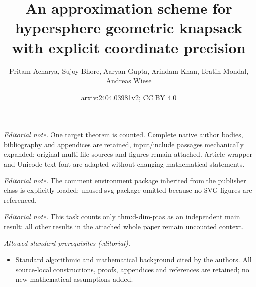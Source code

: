 \documentclass[10pt,a4paper]{article}
\title{An approximation scheme for hypersphere geometric knapsack with explicit coordinate precision}
\author{Pritam Acharya, Sujoy Bhore, Aaryan Gupta, Arindam Khan, Bratin Mondal, Andreas Wiese}
\date{arxiv:2404.03981v2; CC BY 4.0}
\theoremstyle{plain}
\theoremstyle{plain}
\theoremstyle{plain}
\theoremstyle{definition}
\begin{document}
\maketitle
\noindent\textit{Editorial note.} One target theorem is counted. Complete native author bodies, bibliography and appendices are retained, input/include passages mechanically expanded; original multi-file sources and figures remain attached. Article wrapper and Unicode text font are adapted without changing mathematical statements.\par\medskip
\noindent\textit{Editorial note.} The comment environment package inherited from the publisher class is explicitly loaded; unused svg package omitted because no SVG figures are referenced.\par\medskip
\noindent\textit{Editorial note.} This task counts only thm:d-dim-ptas as an independent main result; all other results in the attached whole paper remain uncounted context.\par\medskip
\noindent\textit{Allowed standard prerequisites (editorial).}\begin{itemize}
\item Standard algorithmic and mathematical background cited by the authors. All source-local constructions, proofs, appendices and references are retained; no new mathematical assumptions added.
\end{itemize}\medskip
\end{document}
